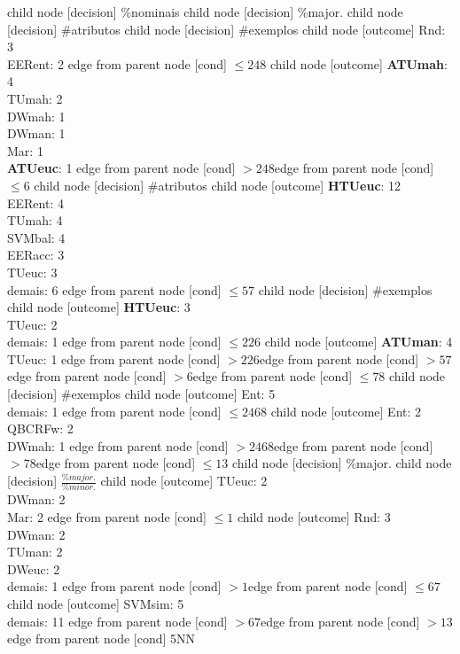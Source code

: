 child {node [decision] {\%nominais}
child {node [decision] {\%major.}
child {node [decision] {\#atributos}
child {node [decision] {\#exemplos}
child {node [outcome] {Rnd: 3\\
EERent: 2} edge from parent node [cond] {$\leq248$}}
child {node [outcome] {\textbf{ATUmah}: 4\\
TUmah: 2\\
DWmah: 1\\
DWman: 1\\
Mar: 1\\
\textbf{ATUeuc}: 1} edge from parent node [cond] {$>248$}}edge from parent node [cond] {$\leq6$}}
child {node [decision] {\#atributos}
child {node [outcome] {\textbf{HTUeuc}: 12\\
EERent: 4\\
TUmah: 4\\
SVMbal: 4\\
EERacc: 3\\
TUeuc: 3\\
demais: 6} edge from parent node [cond] {$\leq57$}}
child {node [decision] {\#exemplos}
child {node [outcome] {\textbf{HTUeuc}: 3\\
TUeuc: 2\\
demais: 1} edge from parent node [cond] {$\leq226$}}
child {node [outcome] {\textbf{ATUman}: 4\\
TUeuc: 1} edge from parent node [cond] {$>226$}}edge from parent node [cond] {$>57$}}edge from parent node [cond] {$>6$}}edge from parent node [cond] {$\leq78$}}
child {node [decision] {\#exemplos}
child {node [outcome] {Ent: 5\\
demais: 1} edge from parent node [cond] {$\leq2468$}}
child {node [outcome] {Ent: 2\\
QBCRFw: 2\\
DWmah: 1} edge from parent node [cond] {$>2468$}}edge from parent node [cond] {$>78$}}edge from parent node [cond] {$\leq13$}}
child {node [decision] {\%major.}
child {node [decision] {$\frac{\%major.}{\%minor.}$}
child {node [outcome] {TUeuc: 2\\
DWman: 2\\
Mar: 2} edge from parent node [cond] {$\leq1$}}
child {node [outcome] {Rnd: 3\\
DWman: 2\\
TUman: 2\\
DWeuc: 2\\
demais: 1} edge from parent node [cond] {$>1$}}edge from parent node [cond] {$\leq67$}}
child {node [outcome] {SVMsim: 5\\
demais: 11} edge from parent node [cond] {$>67$}}edge from parent node [cond] {$>13$}}edge from parent node [cond] {5NN}}
